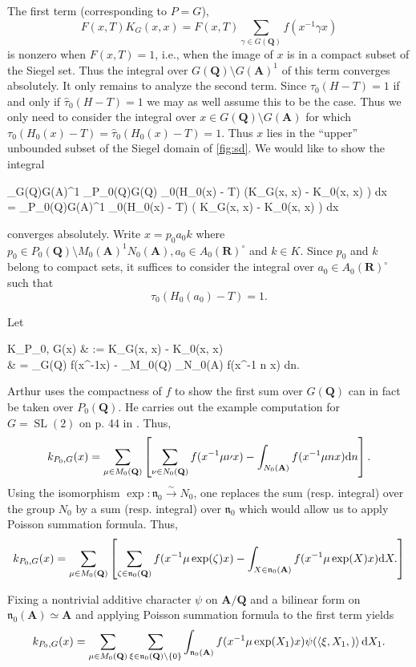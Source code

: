 \documentclass[11pt]{amsart}
\def\A{\mathbf A}
\def\Q{\mathbf Q}
\def\R{\mathbf R}
\def\cb#1{{\color{blue}#1}}
\def\d{\text d}
\def\bs{\setminus} 			%
\def\nnn{\mathfrak n}
\def\sl{\operatorname{SL}}
\def\sprod#1#2{\left\langle #1 , #2 \right\rangle}  %
\theoremstyle{remark}
\begin{document}
\cb{The first term (corresponding to $P=G$),
\[ F(x, T) K_G(x, x) = F(x, T) \sum_{\gamma \in G(\Q)} f(x^{-1}\gamma x) \]
is nonzero when $F(x, T)=1$, i.e., when the image of $x$ is in a compact subset of the Siegel set. Thus the integral over $G(\Q) \bs G(\A)^1$ of this term converges absolutely. It only remains to analyze the second term. Since $\tau_0(H-T) = 1$ if and only if $\hat\tau_0(H-T) = 1$ we may as well assume this to be the case. Thus we only need to consider the integral over $x \in G(\Q)\bs G(\A)$ for which $\tau_0(H_0(x) - T) = \hat\tau_0(H_0(x) - T) = 1$. Thus $x$ lies in the ``upper'' unbounded subset of the Siegel domain of \cref{fig:sd}. We would like to show the integral
\begin{flalign*}
	\int_{G(\Q)\bs G(\A)^1} \sum_{\delta \in P_0(\Q)\bs G(\Q)} \tau_0(H_0(\delta x) - T) \left(K_G(x, x) - K_0(\delta x, \delta x) \right) \d x \\
	= \int_{P_0(\Q)\bs G(\A)^1} \tau_0(H_0(x) - T) \Big( K_G(x, x) - K_0(x, x) \Big) \d x
\end{flalign*}
converges absolutely. Write $x = p_0 a_0 k$ where $p_0 \in P_0(\Q) \bs M_0(\A)^1 N_0(\A), a_0 \in A_0(\R)^\circ$ and $k \in K$. Since $p_0$ and $k$ belong to compact sets, it suffices to consider the integral over $a_0 \in A_0(\R)^\circ$ such that 
\[ \tau_0(H_0(a_0)-T) = 1. \]
}

\cb{Let 
\begin{flalign*}
	K_{P_0, G}(x) & := K_G(x, x) - K_0(x, x) \\
			& = \sum_{\mu \in G(\Q)} f(x^{-1}\mu x) - \sum_{\gamma \in M_0(\Q)} \int_{N_0(\A)} 
				f(x^{-1} \gamma n x) \d n.
\end{flalign*}
Arthur uses the compactness of $f$ to show the first sum over $G(\Q)$ can in fact be taken over $P_0(\Q)$. He carries out the example computation for $G = \sl(2)$ on p. 44 in \cite{clay}. Thus, 
\[ k_{P_0, G}(x) = \sum_{\mu \in M_0(\Q)} \left[\sum_{\nu \in N_0(\Q)} f(x^{-1} \mu \nu x) -
		\int_{N_0(\A)} f(x^{-1} \mu n x) \d n \right]. \]
Using the isomorphism $\exp : \nnn_0 \xrightarrow{\sim} N_0$, one replaces the sum (resp. integral) over the group $N_0$ by a sum (resp. integral) over $\nnn_0$ which would allow us to apply Poisson summation formula. Thus,
\[ k_{P_0, G}(x) = \sum_{\mu \in M_0(\Q)} \left[ \sum_{\zeta \in \nnn_0(\Q)} f(x^{-1} \mu \exp(\zeta) x) -
		\int_{X \in \nnn_0(\A)} f(x^{-1} \mu \exp(X) x) \d X.		
 \right] \]
}

\cb{Fixing a nontrivial additive character $\psi$ on $\A/\Q$ and a bilinear form on $\nnn_0(\A) \simeq \A$ and applying Poisson summation formula to the first term yields
\[ k_{P_0, G}(x) = \sum_{\mu \in M_0(\Q)} \sum_{\xi \in \nnn_0(\Q) \bs \{0 \}} \int_{\nnn_0(\A)}
		f(x^{-1} \mu \exp(X_1) x) \psi(\sprod{\xi, X_1}) \d X_1.
\]
}
\end{document}
